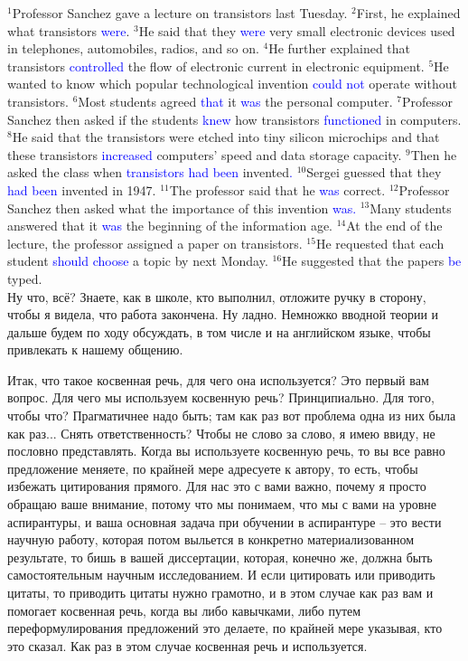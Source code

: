 \documentclass[main.tex]{subfiles}
\begin{document}
$^1$Professor Sanchez gave a lecture on transistors last Tuesday.
$^2$First, he explained what transistors \textcolor{blue}{were}.
$^3$He said that they \textcolor{blue}{were} very small electronic devices used in telephones, automobiles, radios, and so on.
$^4$He further explained that transistors \textcolor{blue}{controlled} the flow of electronic current in electronic equipment.
$^5$He wanted to know which popular technological invention \textcolor{blue}{could not} operate without transistors.
$^6$Most students agreed \textcolor{blue}{that} it \textcolor{blue}{was} the personal computer.
$^7$Professor Sanchez then asked if the students \textcolor{blue}{knew} how transistors \textcolor{blue}{functioned} in computers.
$^8$He said that the transistors were etched into tiny silicon microchips and that these transistors \textcolor{blue}{increased} computers' speed and data storage capacity.
$^9$Then he asked the class when \textcolor{blue}{transistors had been} invented\textcolor{blue}{.}
$^{10}$Sergei guessed that they \textcolor{blue}{had been} invented in 1947.
$^{11}$The professor said that he \textcolor{blue}{was} correct.
$^{12}$Professor Sanchez then asked what the importance of this invention \textcolor{blue}{was.}
$^{13}$Many students answered that it \textcolor{blue}{was} the beginning of the information age.
$^{14}$At the end of the lecture, the professor assigned a paper on transistors.
$^{15}$He requested that each student \textcolor{blue}{should choose} a topic by next Monday.
$^{16}$He suggested that the papers \textcolor{blue}{be} typed.
\\

Ну что, всё?
Знаете, как в школе, кто выполнил, отложите ручку в сторону, чтобы я видела, что работа закончена.
Ну ладно.
Немножко вводной теории и дальше будем по ходу обсуждать, в том числе и на английском языке, чтобы привлекать к нашему общению.

Итак, что такое косвенная речь, для чего она используется?
Это первый вам вопрос.
Для чего мы используем косвенную речь?
Принципиально.
Для того, чтобы что?
Прагматичнее надо быть; там как раз вот проблема одна из них была как раз...
Снять ответственность?
Чтобы не слово за слово, я имею ввиду, не пословно представлять.
Когда вы используете косвенную речь, то вы все равно предложение меняете, по крайней мере адресуете к автору, то есть, чтобы избежать цитирования прямого.
Для нас это с вами важно, почему я просто обращаю ваше внимание, потому что мы понимаем, что мы с вами на уровне аспирантуры, и ваша основная задача при обучении в аспирантуре -- это вести научную работу, которая потом выльется в конкретно материализованном результате, то бишь в вашей диссертации, которая, конечно же, должна быть самостоятельным научным исследованием.
И если цитировать или приводить цитаты, то приводить цитаты нужно грамотно, и в этом случае как раз вам  и помогает косвенная речь, когда вы либо кавычками, либо путем переформулирования предложений это делаете, по крайней мере указывая, кто это сказал.
Как раз в этом случае косвенная речь и используется.
\end{document}
